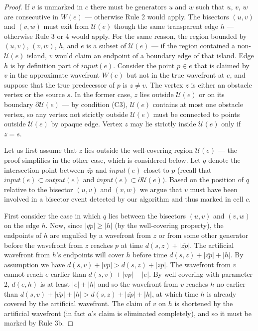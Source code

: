 \begin{proof}
	If $v$ is unmarked in $c$ there must be generators $u$ and $w$ such that
	$u$, $v$, $w$ are consecutive in $W(e)$ --- otherwise  Rule 2 would
	apply. The bisectors $(u,v)$ and $(v,w)$ must exit from $\mathcal{U}(e)$
	though the same transparent edge $h$ --- otherwise Rule 3 or 4 would
	apply. For the same reason, the region bounded by $(u,v)$, $(v,w)$, $h$,
	and $e$ is a subset of $\mathcal{U}(e)$ --- if the region contained a
	non-$\mathcal{U}(e)$ island, $v$ would claim an endpoint of a boundary
	edge of that island. Edge $h$ is by definition part of $input(e)$.
	Consider the point $p \in e$ that is claimed by $v$ in the approximate
	wavefront $W(e)$ but not in the true wavefront at $e$, and suppose that
	the true predecessor of $p$ is $z\neq v$. The vertex $z$ is either an
	obstacle vertex or the source $s$. In the former case, $z$ lies outside
	$\mathcal{U}(e)$ or on its boundary $\partial\mathcal{U}(e)$ --- by
	condition (C3), $\mathcal{U}(e)$ contains at most one obstacle vertex, so
	any vertex not strictly outside $\mathcal{U}(e)$ must be connected to
	points outside $\mathcal{U}(e)$ by opaque edge. Vertex $z$ may lie
	strictly inside $\mathcal{U}(e)$ only if $z=s$.

	Let us first assume that $z$ lies outside the well-covering region
	$\mathcal{U}(e)$ --- the proof simplifies in the other case, which is
	considered below. Let $q$ denote the intersection point between
	$\overline{zp}$ and $input(e)$ closet to $p$ (recall that $input(e)
	\subset output(e)$ and $input(e) \subset \partial\mathcal{U}(e))$. Based
	on the position of $q$ relative  to the bisector $(u,v)$ and $(v,w)$ we
	argue that $v$ must have been involved in a bisector event detected by
	our algorithm and thus marked in cell $c$.

	First consider the case in which $q$ lies between the bisectors $(u,v)$
	and $(v,w)$ on the edge $h$. Now, since $|\overline{qp}|\geq|h|$ (by the
	well-covering property), the endpoints of $h$ are engulfed by a wavefront
	from $z$ or from some other generator before the wavefront from $z$
	reaches $p$ at time $d(s,z) + |\overline{zp}|$. The artificial wavefront
	from $h$'s endpoints will cover $h$ before time
	$d(s,z)+|\overline{zp}|+|h|$. By assumption we have
	$d(s,v)+|\overline{vp}| > d(s,z)+|\overline{zp}|$. The wavefront from $v$
	cannot reach $e$ earlier than $d(s,v)+|\overline{vp}| - |e|$. By
	well-covering with parameter 2, $d(e,h)$ is at least $|e|+|h|$ and so the
	wavefront from $v$ reaches $h$ no earlier than
	$d(s,v)+|\overline{vp}|+|h|>d(s,z)+|\overline{zp}|+|h|$, at which time
	$h$ is already covered by the artificial wavefront. The claim of $v$ on
	$h$ is shortened by the artificial wavefront (in fact $a$'s claim is
	eliminated completely), and so it must be marked by Rule 3b.


\end{proof}
